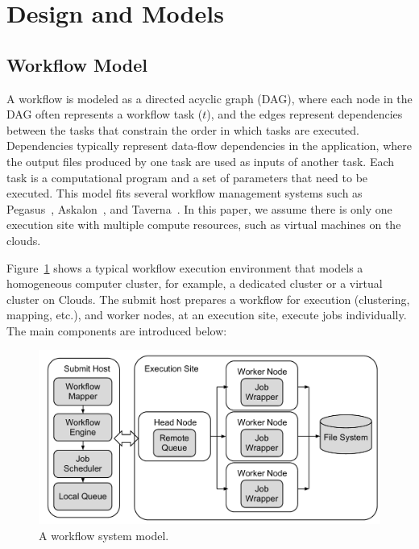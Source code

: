 \documentclass{IOS-Book-Article}
\begin{document}
\section{Design and Models}
\label{sec:models}



\subsection{Workflow Model}


\label{sec:model}


A workflow is modeled as a directed acyclic graph (DAG), where each node in the DAG often represents a workflow task ($t$), and the edges represent dependencies between the tasks that constrain the order in which tasks are executed. Dependencies typically represent data-flow dependencies in the application, where the output files produced by one task are used as inputs of another task. Each task is a computational program and a set of parameters that need to be executed. 
This model fits several workflow management systems such as Pegasus~\cite{Deelman2004}, Askalon~\cite{Fahringer2005}, and Taverna~\cite{Oinn2004}. In this paper, we assume there is only one execution site with multiple compute resources, such as virtual machines on the clouds. 


Figure~\ref{fig:model_system} shows a typical workflow execution environment that models a homogeneous computer cluster, for example, a dedicated cluster or a virtual cluster on Clouds. The submit host prepares a workflow for execution (clustering, mapping, etc.), and worker nodes, at an execution site, execute jobs individually. The main components are introduced below:

\begin{figure}[!htb]
\centering
  \includegraphics[width=0.95\linewidth]{figure1.pdf}
  \caption{A workflow system model.}
  \label{fig:model_system}
\end{figure}
\end{document}
